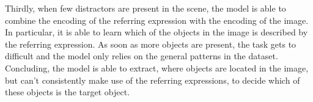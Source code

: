 Thirdly, when few distractors are present in the scene, the model is able to combine the encoding of the referring expression with the encoding of the image.
In particular, it is able to learn which of the objects in the image is described by the referring expression.
As soon as more objects are present, the task gets to difficult and the model only relies on the general patterns in the dataset.
Concluding, the model is able to extract, where objects are located in the image, but can't consistently make use of the referring expressions, to decide which of these objects is the target object.
